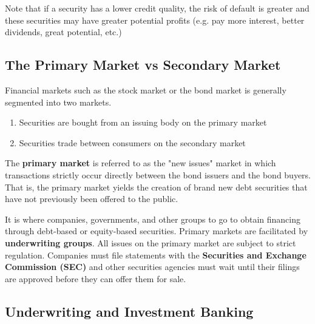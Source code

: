 \documentclass{article}
\begin{document}
  Note that if a security has a lower credit quality, the risk of default is greater and these securities may have greater potential profits (e.g. pay more interest, better dividends, great potential, etc.) 

  \subsection{The Primary Market vs Secondary Market}

    Financial markets such as the stock market or the bond market is generally segmented into two markets. 
    \begin{enumerate}
        \item Securities are bought from an issuing body on the primary market
        \item Securities trade between consumers on the secondary market
    \end{enumerate}

    \begin{definition}
    The \textbf{primary market} is referred to as the "new issues" market in which transactions strictly occur directly between the bond issuers and the bond buyers. That is, the primary market yields the creation of brand new debt securities that have not previously been offered to the public. 

    It is where companies, governments, and other groups to go to obtain financing through debt-based or equity-based securities. Primary markets are facilitated by \textbf{underwriting groups}. All issues on the primary market are subject to strict regulation. Companies must file statements with the \textbf{Securities and Exchange Commission (SEC)} and other securities agencies must wait until their filings are approved before they can offer them for sale. 
    \end{definition}

  \subsection{Underwriting and Investment Banking}
\end{document}
